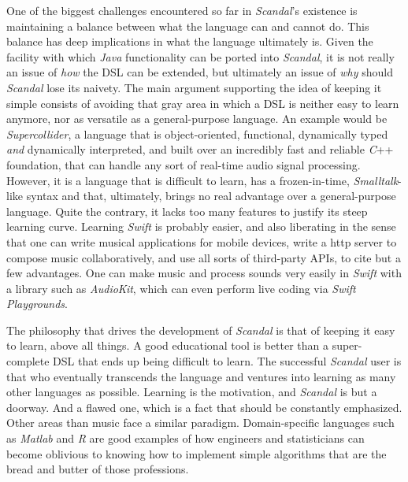 One of the biggest challenges encountered so far in \emph{Scandal}'s existence is maintaining a balance between what the language can and cannot do. This balance has deep implications in what the language ultimately is. Given the facility with which \emph{Java} functionality can be ported into \emph{Scandal}, it is not really an issue of \emph{how} the DSL can be extended, but ultimately an issue of \emph{why} should \emph{Scandal} lose its naivety. The main argument supporting the idea of keeping it simple consists of avoiding that gray area in which a DSL is neither easy to learn anymore, nor as versatile as a general-purpose language. An example would be \emph{Supercollider}, a language that is object-oriented, functional, dynamically typed \emph{and} dynamically interpreted, and built over an incredibly fast and reliable \emph{C}++ foundation, that can handle any sort of real-time audio signal processing. However, it is a language that is difficult to learn, has a frozen-in-time, \emph{Smalltalk}-like syntax and that, ultimately, brings no real advantage over a general-purpose language. Quite the contrary, it lacks too many features to justify its steep learning curve. Learning \emph{Swift} is probably easier, and also liberating in the sense that one can write musical applications for mobile devices, write a http server to compose music collaboratively, and use all sorts of third-party APIs, to cite but a few advantages. One can make music and process sounds very easily in \emph{Swift} with a library such as \emph{AudioKit}, which can even perform live coding via \emph{Swift Playgrounds}.

The philosophy that drives the development of \emph{Scandal} is that of keeping it easy to learn, above all things. A good educational tool is better than a super-complete DSL that ends up being difficult to learn. The successful \emph{Scandal} user is that who eventually transcends the language and ventures into learning as many other languages as possible. Learning is the motivation, and \emph{Scandal} is but a doorway. And a flawed one, which is a fact that should be constantly emphasized. Other areas than music face a similar paradigm. Domain-specific languages such as \emph{Matlab} and \emph{R} are good examples of how engineers and statisticians can become oblivious to knowing how to implement simple algorithms that are the bread and butter of those professions.

